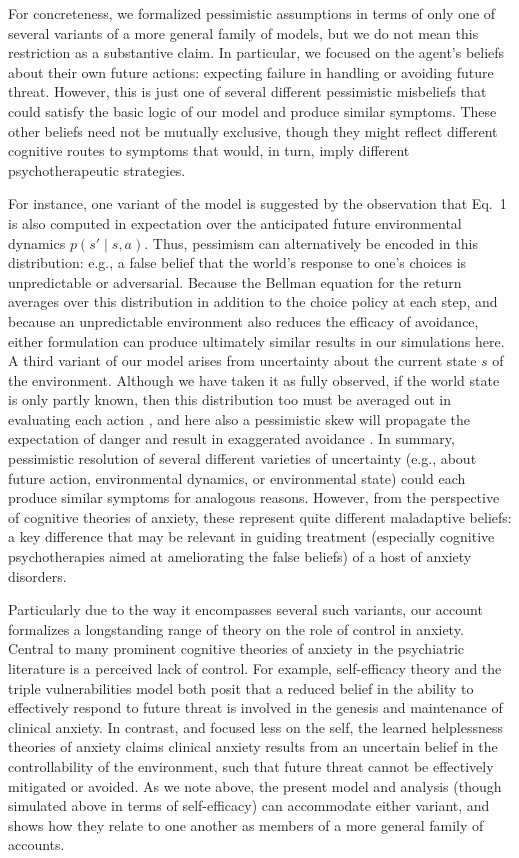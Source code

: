 \documentclass[11pt]{article} %
\begin{document}
For concreteness, we formalized pessimistic assumptions in terms of only one of several variants of a more general family of models, but we do not mean this restriction as a substantive claim. In particular, we focused on the agent's beliefs about their own future actions: expecting failure in handling or avoiding future threat. However, this is just one of several different pessimistic misbeliefs that could satisfy the basic logic of our model and produce similar symptoms. These other beliefs need not be mutually exclusive, though they might reflect different cognitive routes to symptoms that would, in turn, imply different psychotherapeutic strategies.

For instance, one variant of the model is suggested by the observation that Eq.~1 is also computed in expectation over the anticipated future environmental dynamics $p(s' \mid s,a)$. Thus, pessimism can alternatively be encoded in this distribution: e.g., a false belief that the world's response to one's choices is unpredictable or adversarial. Because the Bellman equation for the return averages over this distribution in addition to the choice policy at each step, and because an unpredictable environment also reduces the efficacy of avoidance, either formulation can produce ultimately similar results in our simulations here. A third variant of our model arises from uncertainty about the current state $s$ of the environment. Although we have taken it as fully observed, if the world state is only partly known, then this distribution too must be averaged out in evaluating each action \citep{kaelbling1998}, and here also a pessimistic skew will propagate the expectation of danger and result in exaggerated avoidance \citep{Paulus2012}. In summary, pessimistic resolution of several different varieties of uncertainty (e.g., about future action, environmental dynamics, or environmental state) could each produce similar symptoms for analogous reasons. However, from the perspective of cognitive theories of anxiety, these represent quite different maladaptive beliefs: a key difference that may be relevant in guiding treatment (especially cognitive psychotherapies aimed at ameliorating the false beliefs) of a host of anxiety disorders.

Particularly due to the way it encompasses several such variants, our account formalizes a longstanding range of theory on the role of control in anxiety. Central to many prominent cognitive theories of anxiety in the psychiatric literature is a perceived lack of control. For example, self-efficacy theory \citep{bandura1977} and the triple vulnerabilities model \citep{barlow2002} both posit that a reduced belief in the ability to effectively respond to future threat is involved in the genesis and maintenance of clinical anxiety. In contrast, and focused less on the self, the learned helplessness theories of anxiety \cite{alloy1990} claims clinical anxiety results from an uncertain belief in the controllability of the environment, such that future threat cannot be effectively mitigated or avoided. As we note above, the present model and analysis (though simulated above in terms of self-efficacy) can accommodate either variant, and shows how they relate to one another as members of a more general family of accounts. 
\end{document}
